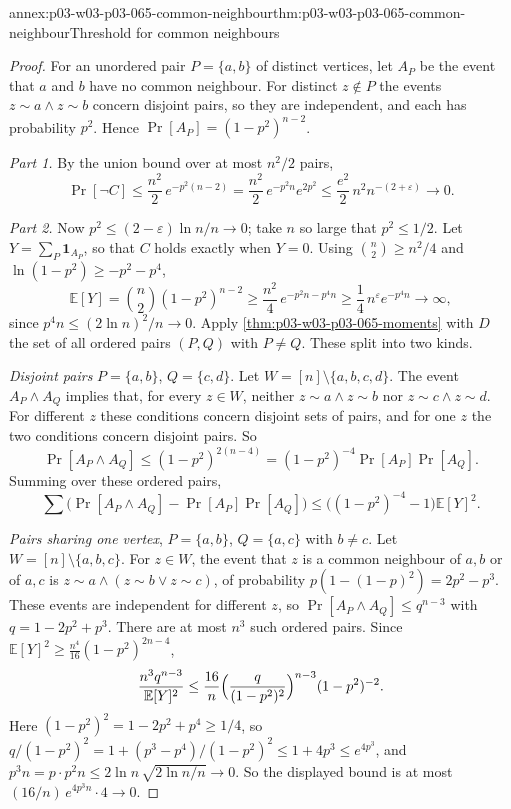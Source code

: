 \begin{annexitem}{annex:p03-w03-p03-065-common-neighbour}{thm:p03-w03-p03-065-common-neighbour}{Threshold for common neighbours}
\begin{proof}
For an unordered pair \(P=\{a,b\}\) of distinct vertices, let \(A_P\) be the
event that \(a\) and \(b\) have no common neighbour.  For distinct
\(z\notin P\) the events \(z\sim a\wedge z\sim b\) concern disjoint pairs, so
they are independent, and each has probability \(p^2\).  Hence
\(\Pr[A_P]=(1-p^2)^{n-2}\).

\emph{Part 1.}  By the union bound over at most \(n^2/2\) pairs,
\[
  \Pr[\neg C]\leq\frac{n^2}2\,e^{-p^2(n-2)}
  =\frac{n^2}2\,e^{-p^2n}e^{2p^2}
  \leq\frac{e^2}2\,n^2n^{-(2+\varepsilon)}\to0 .
\]

\emph{Part 2.}  Now \(p^2\leq(2-\varepsilon)\ln n/n\to0\); take \(n\) so
large that \(p^2\leq1/2\).  Let \(Y=\sum_P\mathbf 1_{A_P}\), so that \(C\)
holds exactly when \(Y=0\).  Using \(\binom n2\geq n^2/4\) and
\(\ln(1-p^2)\geq-p^2-p^4\),
\[
  \mathbb E[Y]=\binom n2(1-p^2)^{n-2}
  \geq\frac{n^2}4\,e^{-p^2n-p^4n}
  \geq\frac14\,n^{\varepsilon}e^{-p^4n}\to\infty ,
\]
since \(p^4n\leq(2\ln n)^2/n\to0\).  Apply
\cref{thm:p03-w03-p03-065-moments} with \(D\) the set of all ordered pairs
\((P,Q)\) with \(P\neq Q\).  These split into two kinds.

\emph{Disjoint pairs} \(P=\{a,b\}\), \(Q=\{c,d\}\).  Let
\(W=[n]\setminus\{a,b,c,d\}\).  The event \(A_P\wedge A_Q\) implies that, for
every \(z\in W\), neither \(z\sim a\wedge z\sim b\) nor
\(z\sim c\wedge z\sim d\).  For different \(z\) these conditions concern
disjoint sets of pairs, and for one \(z\) the two conditions concern
disjoint pairs.  So
\[
  \Pr[A_P\wedge A_Q]\leq(1-p^2)^{2(n-4)}=(1-p^2)^{-4}\Pr[A_P]\Pr[A_Q].
\]
Summing over these ordered pairs,
\[
  \sum\bigl(\Pr[A_P\wedge A_Q]-\Pr[A_P]\Pr[A_Q]\bigr)
  \leq\bigl((1-p^2)^{-4}-1\bigr)\mathbb E[Y]^2 .
\]

\emph{Pairs sharing one vertex}, \(P=\{a,b\}\), \(Q=\{a,c\}\) with
\(b\neq c\).  Let \(W=[n]\setminus\{a,b,c\}\).  For \(z\in W\), the event
that \(z\) is a common neighbour of \(a,b\) or of \(a,c\) is
\(z\sim a\wedge(z\sim b\vee z\sim c)\), of probability
\(p(1-(1-p)^2)=2p^2-p^3\).  These events are independent for different
\(z\), so
\(\Pr[A_P\wedge A_Q]\leq q^{n-3}\) with \(q=1-2p^2+p^3\).  There are at most
\(n^3\) such ordered pairs.  Since \(\mathbb E[Y]^2\geq\frac{n^4}{16}
(1-p^2)^{2n-4}\),
\[
  \frac{n^3q^{n-3}}{\mathbb E[Y]^2}
  \leq\frac{16}n\Bigl(\frac q{(1-p^2)^2}\Bigr)^{n-3}(1-p^2)^{-2}.
\]
Here \((1-p^2)^2=1-2p^2+p^4\geq1/4\), so
\(q/(1-p^2)^2=1+(p^3-p^4)/(1-p^2)^2\leq1+4p^3\leq e^{4p^3}\), and
\(p^3n=p\cdot p^2n\leq2\ln n\,\sqrt{2\ln n/n}\to0\).  So the displayed bound
is at most \((16/n)\,e^{4p^3n}\cdot4\to0\).


\end{proof}
\end{annexitem}
